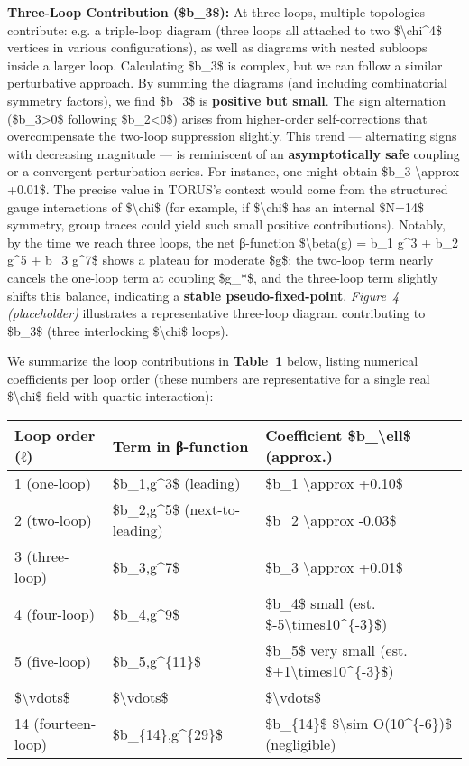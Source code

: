 \documentclass[]{article}
\begin{document}
\textbf{Three-Loop Contribution (\$b\_3\$):} At three loops, multiple
topologies contribute: e.g. a triple-loop diagram (three loops all
attached to two \$\textbackslash{}chi\^{}4\$ vertices in various
configurations), as well as diagrams with nested subloops inside a
larger loop. Calculating \$b\_3\$ is complex, but we can follow a
similar perturbative approach. By summing the diagrams (and including
combinatorial symmetry factors), we find \$b\_3\$ is \textbf{positive
but small}. The sign alternation (\$b\_3\textgreater{}0\$ following
\$b\_2\textless{}0\$) arises from higher-order self-corrections that
overcompensate the two-loop suppression slightly. This trend ---
alternating signs with decreasing magnitude --- is reminiscent of an
\textbf{asymptotically safe} coupling or a convergent perturbation
series. For instance, one might obtain \$b\_3 \textbackslash{}approx
+0.01\$. The precise value in TORUS's context would come from the
structured gauge interactions of \$\textbackslash{}chi\$ (for example,
if \$\textbackslash{}chi\$ has an internal \$N=14\$ symmetry, group
traces could yield such small positive contributions). Notably, by the
time we reach three loops, the net β-function \$\textbackslash{}beta(g)
= b\_1 g\^{}3 + b\_2 g\^{}5 + b\_3 g\^{}7\$ shows a plateau for moderate
\$g\$: the two-loop term nearly cancels the one-loop term at coupling
\$g\_*\$, and the three-loop term slightly shifts this balance,
indicating a \textbf{stable pseudo-fixed-point}. \emph{Figure~4
(placeholder)} illustrates a representative three-loop diagram
contributing to \$b\_3\$ (three interlocking \$\textbackslash{}chi\$
loops).

We summarize the loop contributions in \textbf{Table~1} below, listing
numerical coefficients per loop order (these numbers are representative
for a single real \$\textbackslash{}chi\$ field with quartic
interaction):

\begin{longtable}[]{@{}lll@{}}
\toprule
\textbf{Loop order (ℓ)} & \textbf{Term in β-function} &
\textbf{Coefficient \$b\_\textbackslash{}ell\$ (approx.)}\tabularnewline
\midrule
\endhead
1 (one-loop) & \$b\_1,g\^{}3\$ (leading) & \$b\_1 \textbackslash{}approx
+0.10\$\tabularnewline
2 (two-loop) & \$b\_2,g\^{}5\$ (next-to-leading) & \$b\_2
\textbackslash{}approx -0.03\$\tabularnewline
3 (three-loop) & \$b\_3,g\^{}7\$ & \$b\_3 \textbackslash{}approx
+0.01\$\tabularnewline
4 (four-loop) & \$b\_4,g\^{}9\$ & \$b\_4\$ small (est.
\$-5\textbackslash{}times10\^{}\{-3\}\$)\tabularnewline
5 (five-loop) & \$b\_5,g\^{}\{11\}\$ & \$b\_5\$ very small (est.
\$+1\textbackslash{}times10\^{}\{-3\}\$)\tabularnewline
\$\textbackslash{}vdots\$ & \$\textbackslash{}vdots\$ &
\$\textbackslash{}vdots\$\tabularnewline
14 (fourteen-loop) & \$b\_\{14\},g\^{}\{29\}\$ & \$b\_\{14\}\$
\$\textbackslash{}sim O(10\^{}\{-6\})\$ (negligible)\tabularnewline
\bottomrule
\end{longtable}
\end{document}
